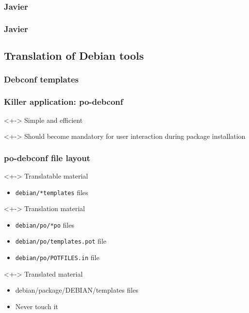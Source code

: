 \documentclass{beamer}
\begin{document}
\begin{frame}
  \frametitle{Javier}
\end{frame}

\begin{frame}
  \frametitle{Javier}
\end{frame}

\subsection{Translation of Debian tools}

\subsubsection{Debconf templates}

\begin{frame}
  \frametitle{Killer application: po-debconf}
	\begin{block}<+->
		{Simple and efficient}
	\end{block}
	\begin{block}<+->
		{Should become mandatory for user interaction during package installation}
	\end{block}
\end{frame}

\begin{frame}
  \frametitle{po-debconf file layout}
	\begin{block}<+->
		{Translatable material}
		\begin{itemize}
		\item
			\texttt{debian/*templates} files
		\end{itemize}
	\end{block}
	\begin{block}<+->
		{Translation material}
		\begin{itemize}
		\item
			\texttt{debian/po/*po} files
		\item
			\texttt{debian/po/templates.pot} file
		\item
			\texttt{debian/po/POTFILES.in} file
		\end{itemize}
	\end{block}
	\begin{block}<+->
		{Translated material}
		\begin{itemize}
		\item
			debian/package/DEBIAN/templates files
		\item
			Never touch it
		\end{itemize}
	\end{block}
\end{frame}
\end{document}

